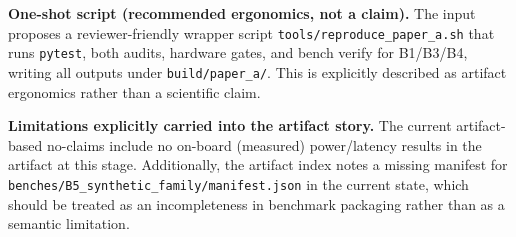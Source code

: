 \textbf{One-shot script (recommended ergonomics, not a claim).}
The input proposes a reviewer-friendly wrapper script \texttt{tools/reproduce\_paper\_a.sh} that runs \texttt{pytest}, both audits, hardware gates, and bench verify for B1/B3/B4, writing all outputs under \texttt{build/paper\_a/}. This is explicitly described as artifact ergonomics rather than a scientific claim.

\textbf{Limitations explicitly carried into the artifact story.}
The current artifact-based no-claims include no on-board (measured) power/latency results in the artifact at this stage. Additionally, the artifact index notes a missing manifest for \texttt{benches/B5\_synthetic\_family/manifest.json} in the current state, which should be treated as an incompleteness in benchmark packaging rather than as a semantic limitation.
